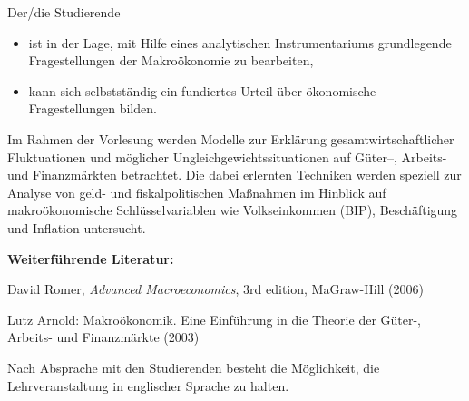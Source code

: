 \begin{course}
\begin{learningoutcomes}
Der/die Studierende

 \begin{itemize}\item ist in der Lage, mit Hilfe eines analytischen Instrumentariums grundlegende Fragestellungen der Makroökonomie zu bearbeiten,  \item kann sich selbstständig ein fundiertes Urteil über ökonomische Fragestellungen bilden.  \end{itemize}
\end{learningoutcomes}

\begin{content}
Im Rahmen der Vorlesung werden Modelle zur Erklärung gesamtwirtschaftlicher Fluktuationen und möglicher Ungleichgewichtssituationen auf Güter–, Arbeits- und Finanzmärkten betrachtet. \newline
Die dabei erlernten Techniken werden speziell zur Analyse von geld- und fiskalpolitischen Maßnahmen im Hinblick auf makroökonomische Schlüsselvariablen wie Volkseinkommen (BIP), Beschäftigung und Inflation untersucht.


\end{content}



\begin{literature}\textbf{Weiterführende Literatur:}

 

David Romer, \emph{Advanced Macroeconomics}, 3rd edition, MaGraw-Hill (2006)

 

Lutz Arnold: Makroökonomik. Eine Einführung in die Theorie der Güter-, Arbeits- und Finanzmärkte (2003)

\end{literature}

\begin{remarks}Nach Absprache mit den Studierenden besteht die Möglichkeit, die Lehrveranstaltung in englischer Sprache zu halten.

\end{remarks}

\end{course}